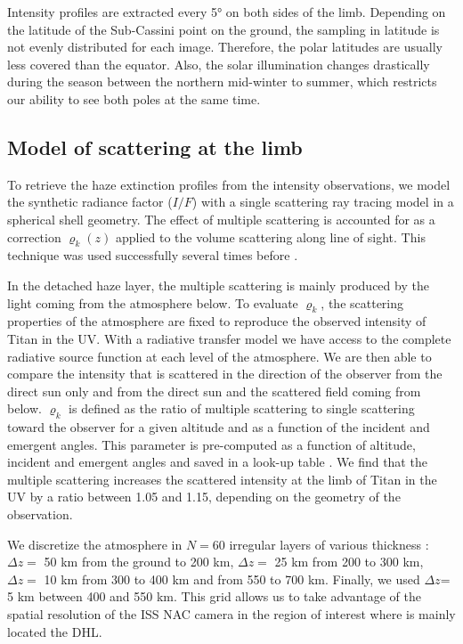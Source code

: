 Intensity profiles are extracted every \ang{5} on both sides of the limb. Depending on the
latitude of the Sub-Cassini point on the ground, the sampling in latitude is not evenly distributed for each image.
Therefore, the polar latitudes are usually less covered than the equator.
Also, the solar illumination changes drastically during the
season between the northern mid-winter to summer, which restricts our ability to see both poles at the same time.


\subsection{Model of scattering at the limb}

To retrieve the haze extinction profiles from the intensity observations, we model the synthetic
radiance factor ($I/F$) with a single scattering ray tracing model in a spherical shell geometry.
The effect of multiple scattering is accounted for as a correction $\varrho_k (z)$
applied to the volume scattering along line of sight.
This technique was used successfully several times before \citep[\eg][]{Rages1983, Rannou1997, Seignovert2017, West2018}.

In the detached haze layer, the multiple scattering is mainly produced by the light coming from the atmosphere below. To
evaluate $\varrho_k$, the scattering properties of the atmosphere are fixed to
reproduce the observed intensity of Titan in the UV. With a radiative transfer model \citep[SHDOMPP, from ][]{Evans1998}
we have access to the complete radiative source function at each level of the atmosphere. We are then able to compare the
intensity that is scattered in the direction of the observer from the direct sun only and from the direct sun and the scattered
field coming from below. $\varrho_k$ is defined as the ratio of multiple scattering to single scattering toward the observer
for a given altitude and as a function of the incident and emergent angles. This parameter is pre-computed as a function of
altitude, incident and emergent angles and saved in a look-up table \citep[see.][for details]{West2018}.
We find that the multiple scattering increases the scattered intensity at the limb of Titan in the UV by a ratio between
1.05 and 1.15, depending on the geometry of the observation.

We discretize the atmosphere in $N=60$ irregular layers of various thickness : $\Delta z =$ 50 km from the
ground to 200 km, $\Delta z =$ 25 km from 200 to 300 km, $\Delta z =$ 10 km from 300 to 400 km and from 550 to 700 km.
Finally, we used $\Delta z$= 5 km between 400 and 550 km. This grid allows us to take advantage of the spatial resolution
of the ISS NAC camera in the region of interest where is mainly located the DHL.


